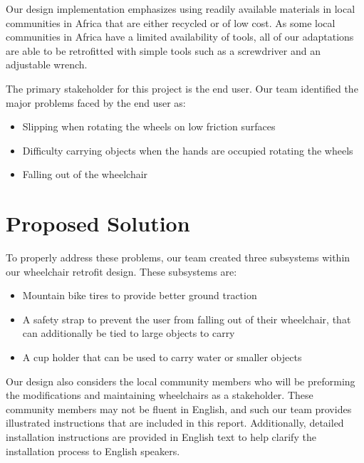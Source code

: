 \documentclass[12pt]{report}
\begin{document}
Our design implementation emphasizes using readily
available materials in local communities in Africa that are either recycled or of low cost.
As some local communities in Africa have a limited availability
of tools, all of our adaptations are able to be retrofitted with simple tools
such as a screwdriver and an adjustable wrench.

The primary stakeholder for this project is the end user. Our team identified the major problems faced
by the end user as:

\begin{itemize}
    \item Slipping when rotating the wheels on low friction
        surfaces
    \item Difficulty carrying objects when the hands are occupied rotating the wheels
    \item Falling out of the wheelchair
\end{itemize}

\section{Proposed Solution}

To properly address these problems, our team created three subsystems within
our wheelchair retrofit design. These subsystems are:

\begin{itemize}
    \item Mountain bike tires to provide better ground traction
    \item A safety strap to prevent the user from falling out of their
        wheelchair, that can additionally be tied to large objects to carry
    \item A cup holder that can be used to carry water or smaller objects
\end{itemize}


Our design also considers the local community members who will be preforming
the modifications and maintaining wheelchairs as a stakeholder. These community
members may not be fluent in English, and such our team provides illustrated instructions
that are included in this report. Additionally, detailed installation
instructions are provided in English text to help clarify the installation
process to English speakers.
\end{document}
